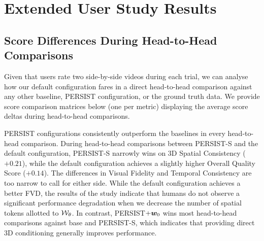 \documentclass{article}
\theoremstyle{plain}
\theoremstyle{definition}
\theoremstyle{remark}
\begin{document}
\section{Extended User Study Results}\label{app:ext_user_study}

\subsection{Score Differences During Head-to-Head Comparisons}
Given that users rate two side-by-side videos during each trial, we can analyse how our default configuration fares in a direct head-to-head comparison against any other baseline, PERSIST configuration, or the ground truth data. We provide score comparison matrices below (one per metric) displaying the average score deltas during head-to-head comparisons.

PERSIST configurations consistently outperform the baselines in every head-to-head comparison. During head-to-head comparisons between PERSIST-S and the default configuration, PERSIST-S narrowly wins on 3D Spatial Consistency ($+0.21$), while the default configuration achieves a slightly higher Overall Quality Score ($+0.14$). The differences in Visual Fidelity and Temporal Consistency are too narrow to call for either side. While the default configuration achieves a better FVD, the results of the study indicate that humans do not observe a significant performance degradation when we decrease the number of spatial tokens allotted to ${\mathcal{W}}_\theta$. In contrast, PERSIST$+{\bm{w}}_0$ wins most head-to-head comparisons against base and PERSIST-S, which indicates that providing direct 3D conditioning generally improves performance. 
\end{document}
